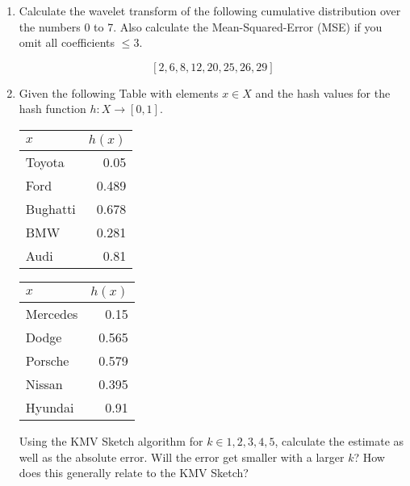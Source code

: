 


\newcommand{\subtitle}{\textbf{Exercise 4}}
\newcommand{\outdate}{19.11.2019}
\newcommand{\duedate}{25.11.2018 16:00 CET}









\begin{enumerate}
\item
  Calculate the wavelet transform of the following cumulative distribution over the numbers 0 to 7.
  Also calculate the Mean-Squared-Error (MSE) if you omit all coefficients $\leq 3$.

  $$[2, 6, 8, 12, 20, 25, 26, 29]$$
 
 
  

\item Given the following Table with elements $x \in X$ and the hash values for the hash function $h: X \rightarrow [0,1]$.\\

\begin{center}
\begin{minipage}{0.2\columnwidth}
\begin{tabular}{|l|r|} \hline
$x$  & $h(x)$ \\ \hline \hline
Toyota & 0.05 \\ \hline
Ford & 0.489 \\ \hline
Bughatti & 0.678 \\ \hline
BMW & 0.281 \\ \hline
Audi & 0.81 \\ \hline
\end{tabular}
\end{minipage}
\begin{minipage}{0.3\columnwidth}
\begin{tabular}{|l|r|} \hline
$x$  & $h(x)$ \\ \hline \hline
Mercedes & 0.15 \\ \hline
Dodge & 0.565 \\ \hline
Porsche & 0.579 \\ \hline
Nissan & 0.395 \\ \hline
Hyundai & 0.91 \\ \hline
\end{tabular}
\end{minipage}
\end{center}

Using the KMV Sketch algorithm for $ k \in {1, 2, 3, 4, 5} $, calculate the estimate as well as the absolute error. Will the error get smaller with a larger $ k $? How does this generally relate to the KMV Sketch?

 

\end{enumerate}

